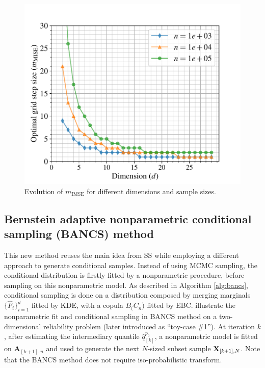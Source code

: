 \begin{figure}
    \centering
    \includegraphics[width=0.6\linewidth]{part3/figures/BANCS/hMISE.pdf}
    \caption{Evolution of $m_{\mathrm{IMSE}}$ for different dimensions and sample sizes.}
    \label{fig:hmise}
\end{figure}


\subsection{Bernstein adaptive nonparametric conditional sampling (BANCS) method}

This new method reuses the main idea from SS while employing a different approach to generate conditional samples. 
Instead of using MCMC sampling, the conditional distribution is firstly fitted by a nonparametric procedure, before sampling on this nonparametric model. 
As described in Algorithm \ref{alg:bancs}, conditional sampling is done on a distribution composed by merging marginals $\{\widehat{F}_i\}_{i=1}^d$ fitted by KDE, with a copula  $B_\bm(C_n)$ fitted by EBC. 
 illustrate the nonparametric fit and conditional sampling in BANCS method on a two-dimensional reliability problem (later introduced as ``toy-case \#1''). 
At iteration $k$, after estimating the intermediary quantile $\widehat{q}_{[k]}^{p_0}$, a nonparametric model is fitted on $\mathbf{A}_{[k+1], n}$ and used to generate the next $N$-sized subset sample ${\bf X}_{[k+1], N}$. 
Note that the BANCS method does not require iso-probabilistic transform.

